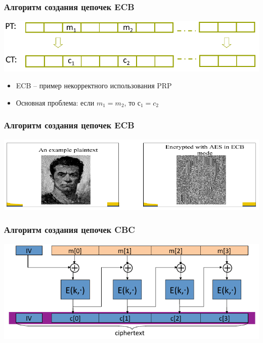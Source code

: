 \documentclass{beamer}
\begin{document}



\begin{frame}
  \frametitle{Алгоритм создания цепочек ECB}

  \includegraphics[width=\linewidth]{images/png/ECB_mode}

  \begin{itemize}
    \item{ECB -- пример некорректного использования PRP}
    \item{Основная проблема: если $m_{1}=m_{2}$, то $с_{1}=c_{2}$}
  \end{itemize}

\end{frame}


\begin{frame}
  \frametitle{Алгоритм создания цепочек ECB}

  \includegraphics[width=\linewidth]{images/png/ECB_failure}

\end{frame}


\begin{frame}
  \frametitle{Алгоритм создания цепочек CBC}

  \includegraphics[width=\linewidth]{images/png/CBC_random_IV}

\end{frame}
\end{document}
